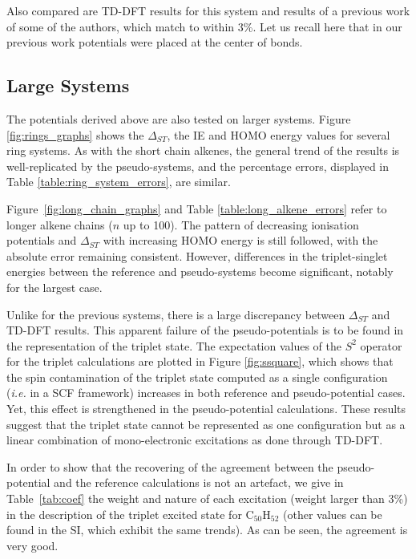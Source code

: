 \documentclass[12pt]{article}
\begin{document}
Also compared are TD-DFT results for this system and results of a previous work of some of the authors, which match to within 3\%.\cite{drujon_pseudopotentials_2013}
Let us recall here that in our previous work potentials were placed at the center of bonds.

\subsection*{\sffamily \large Large Systems}

The potentials derived above are also tested on larger systems.
Figure \ref{fig:rings_graphs} shows the $\Delta_{ST}$, the IE and
HOMO energy values for several ring systems.
As with the short chain alkenes, the general trend of the results is well-replicated
by the pseudo-systems, and the percentage errors, displayed in Table
\ref{table:ring_system_errors}, are similar.

Figure~\ref{fig:long_chain_graphs} and Table \ref{table:long_alkene_errors} refer to longer 
alkene chains (\(n\) up to 100).
The pattern of decreasing ionisation potentials and $\Delta_{ST}$ with increasing HOMO
energy is still followed, with the absolute error remaining consistent.
However, differences in the triplet-singlet energies between the reference and pseudo-systems 
become significant, notably for the largest case.

Unlike for the previous systems, there is a large discrepancy between $\Delta_{ST}$
and TD-DFT results.
This apparent failure of the pseudo-potentials is to be found in the representation
of the triplet state. The expectation values of the $S^2$ operator for the triplet calculations
are plotted in Figure \ref{fig:ssquare}, which shows that the spin contamination
of the triplet state computed as a single configuration (\emph{i.e.} in a SCF
framework) increases in both reference and pseudo-potential cases.
Yet, this effect is strengthened in the pseudo-potential calculations.
These results suggest that the triplet state cannot be represented as one configuration
but as a linear combination of mono-electronic excitations as done through TD-DFT.

In order to show that the recovering of the agreement between the pseudo-potential
and the reference calculations is not an artefact, we give in Table~\ref{tab:coef}
the weight and nature of each excitation (weight larger than 3\%)
in the description of the triplet excited state for
C$_{50}$H$_{52}$ (other values can be found in the SI, which exhibit the same trends).
As can be seen, the agreement is very good. 
\end{document}
